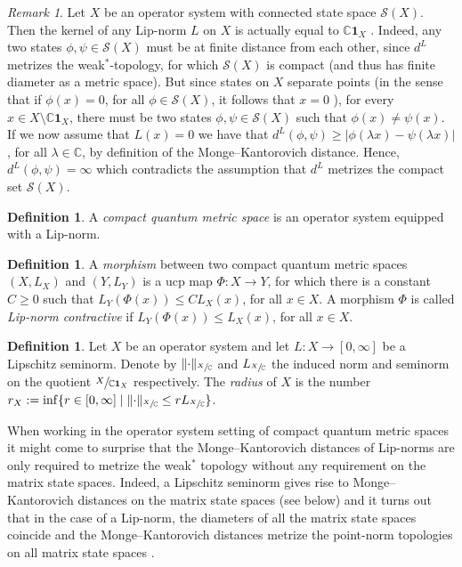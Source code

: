 \documentclass{amsart}
\theoremstyle{plain}
\theoremstyle{definition}
\newtheorem{definition}[theorem]{Definition}
\theoremstyle{remark}
\newtheorem{remark}[theorem]{Remark}
\begin{document}
	\begin{remark}
		Let $X$ be an operator system with connected state space $\mathcal{S}(X)$.
		Then the kernel of any Lip-norm $L$ on $X$ is actually equal to $\mathbb{C} \mathbf{1}_X$ \cite[Lemma 2.2]{KK21}.
		Indeed, any two states $\phi, \psi \in \mathcal{S}(X)$ must be at finite distance from each other, since $d^L$ metrizes the weak$^*$-topology, for which $\mathcal{S}(X)$ is compact (and thus has finite diameter as a metric space).
		But since states on $X$ separate points (in the sense that if $\phi(x) = 0$, for all $\phi \in \mathcal{S}(X)$, it follows that $x = 0$ \cite[Theorem 4.3.4(i)]{KR1}), for every $x \in X \setminus \mathbb{C}\mathbf{1}_X$, there must be two states $\phi, \psi \in \mathcal{S}(X)$ such that $\phi(x) \neq \psi(x)$.
		If we now assume that $L(x)=0$ we have that $d^L(\phi,\psi) \geq |\phi(\lambda x) - \psi(\lambda x)|$, for all $\lambda \in \mathbb{C}$, by definition of the Monge--Kantorovich distance.
		Hence, $d^L(\phi,\psi) = \infty$ which contradicts the assumption that $d^L$ metrizes the compact set $\mathcal{S}(X)$.
	\end{remark}
	
	\begin{definition}
		A \emph{compact quantum metric space} is an operator system equipped with a Lip-norm.
	\end{definition}
	
	\begin{definition}
		A \emph{morphism} between two compact quantum metric spaces $(X,L_X)$ and $(Y,L_Y)$ is a ucp map $\Phi : X \rightarrow Y$, for which there is a constant $C \geq 0$ such that $L_Y(\Phi(x)) \leq C L_X(x)$, for all $x \in X$.
		A morphism $\Phi$ is called \emph{Lip-norm contractive} if $L_Y(\Phi(x)) \leq L_X(x)$, for all $x \in X$.
	\end{definition}
	
	\begin{definition}
		Let $X$ be an operator system and let $L : X \rightarrow [0,\infty]$ be a Lipschitz seminorm.
		Denote by $\lVert\cdot\rVert_{\sfrac{X}{\mathbb{C}}}$ and $L_{\sfrac{X}{\mathbb{C}}}$ the induced norm and seminorm on the quotient $\sfrac{X}{\mathbb{C}\mathbf{1}_X}$ respectively.
		The \emph{radius} of $X$ is the number $r_X := \inf\{r \in [0,\infty] \mid \lVert\cdot\rVert_{\sfrac{X}{\mathbb{C}}} \leq r  L_{\sfrac{X}{\mathbb{C}}}\}$.
	\end{definition}
	
	When working in the operator system setting of compact quantum metric spaces it might come to surprise that the Monge--Kantorovich distances of Lip-norms are only required to metrize the weak$^*$ topology without any requirement on the matrix state spaces.
	Indeed, a Lipschitz seminorm gives rise to Monge--Kantorovich distances on the matrix state spaces (see below) and it turns out that in the case of a Lip-norm, the diameters of all the matrix state spaces coincide \cite[Proposition 2.9]{Ker03} and the Monge--Kantorovich distances metrize the point-norm topologies on all matrix state spaces \cite[Proposition 2.12]{Ker03}.
	
\end{document}
